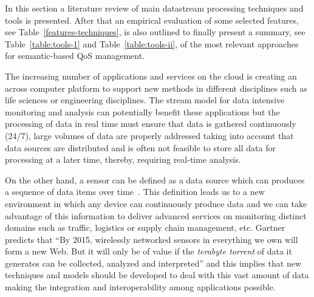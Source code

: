 In this section a literature review of main datastream processing techniques and tools is presented. After that 
an empirical evaluation of some selected features, see Table~\ref{features-techniques}, is also outlined to finally present 
a summary, see Table~\ref{table:tools-1} and Table~\ref{table:tools-ii}, of the most 
relevant approaches for semantic-based QoS management.

The increasing number of applications and services on the cloud is creating an 
across computer platform to support new methods in different disciplines such as 
life sciences or engineering disciplines. The stream model for data intensive 
monitoring and analysis can potentially benefit these applications but the 
processing of data in real time must ensure that data is gathered continuously 
(24/7), large volumes of data are properly addressed taking into account that 
data sources are distributed and is often not feasible to store all data for 
processing at a later time, thereby, requiring real-time analysis. 

On the other hand, a sensor can be defined as a data source which can produces a 
sequence of data items over time~\cite{deri2010}. This definition leads us to a new 
environment in which any device can continuously produce data and we can take 
advantage of this information to deliver advanced services on monitoring 
distinct domains such as traffic, logistics or supply chain management, etc. 
Gartner predicts that ``By 2015, wirelessly networked sensors in everything we 
own will form a new Web. But it will only be of value if the \textit{terabyte torrent} 
of data it generates can be collected, analyzed and interpreted'' and this 
implies that new techniques and models should be developed to deal with this 
vast amount of data making the integration and interoperability among 
applications possible.

